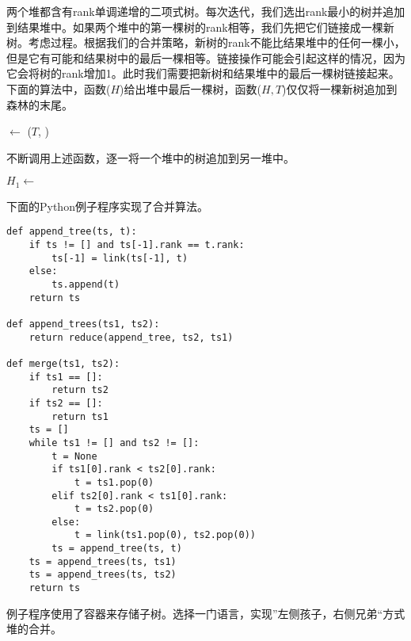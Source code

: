 \documentclass[UTF8]{article}
\begin{document}
两个堆都含有rank单调递增的二项式树。每次迭代，我们选出rank最小的树并追加到结果堆中。如果两个堆中的第一棵树的rank相等，我们先把它们链接成一棵新树。考虑过程。根据我们的合并策略，新树的rank不能比结果堆中的任何一棵小，但是它有可能和结果树中的最后一棵相等。链接操作可能会引起这样的情况，因为它会将树的rank增加1。此时我们需要把新树和结果堆中的最后一棵树链接起来。下面的算法中，函数($H$)给出堆中最后一棵树，函数($H, T$)仅仅将一棵新树追加到森林的末尾。

\begin{algorithmic}[1]
    \State {} $\gets$ ($T$, )
  \Else
    \State {}
  \EndIf
\EndFunction
\end{algorithmic}

不断调用上述函数，逐一将一个堆中的树追加到另一堆中。

\begin{algorithmic}[1]
    \State $H_1 \gets $ 
  \EndFor
\EndFunction
\end{algorithmic}

下面的Python例子程序实现了合并算法。

\lstset{language=Python}
\begin{lstlisting}
def append_tree(ts, t):
    if ts != [] and ts[-1].rank == t.rank:
        ts[-1] = link(ts[-1], t)
    else:
        ts.append(t)
    return ts

def append_trees(ts1, ts2):
    return reduce(append_tree, ts2, ts1)

def merge(ts1, ts2):
    if ts1 == []:
        return ts2
    if ts2 == []:
        return ts1
    ts = []
    while ts1 != [] and ts2 != []:
        t = None
        if ts1[0].rank < ts2[0].rank:
            t = ts1.pop(0)
        elif ts2[0].rank < ts1[0].rank:
            t = ts2.pop(0)
        else:
            t = link(ts1.pop(0), ts2.pop(0))
        ts = append_tree(ts, t)
    ts = append_trees(ts, ts1)
    ts = append_trees(ts, ts2)
    return ts
\end{lstlisting}

\begin{Exercise}

例子程序使用了容器来存储子树。选择一门语言，实现”左侧孩子，右侧兄弟“方式堆的合并。

\end{Exercise}
\end{document}
